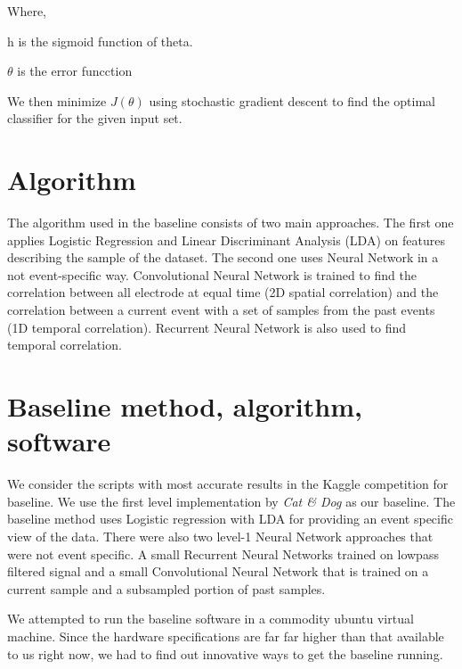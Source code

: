 \documentclass[]{article}
\begin{document}
Where,

h is the sigmoid function of theta.

\(\theta\) is the error funcction

We then minimize \(J(\theta)\) using stochastic gradient descent to find the optimal classifier for the given input set.

\section{Algorithm}
The algorithm used in the baseline consists of two main approaches. The first one applies Logistic Regression and Linear Discriminant Analysis (LDA) on features describing the sample of the dataset. The second one uses Neural Network in a not event-specific way. Convolutional Neural Network is trained to find the correlation between all electrode at equal time (2D spatial correlation) and the correlation between a current event with a set of samples from the past events (1D temporal correlation). Recurrent Neural Network is also used to find temporal correlation.


\section{Baseline method, algorithm, software}
We consider the scripts with most accurate results in the Kaggle competition for baseline\cite{kaggleleaderboard}.  We use the first level implementation by \textit{Cat \& Dog}\cite{kagglewinners} as our baseline.
The baseline method uses Logistic regression with LDA for providing an event specific view of the data.  There were also two level-1 Neural Network approaches that were not event specific.
A small Recurrent Neural Networks trained on lowpass filtered signal and a small Convolutional Neural Network that is trained on a current sample and a subsampled portion of past samples.

We attempted to run the baseline software\cite{baselineSoftware} in a commodity ubuntu virtual machine.  Since the hardware specifications\cite{hardwarespecifications} are far far higher than that available to us right now, we had to find out innovative ways to get the baseline running.
\end{document}
